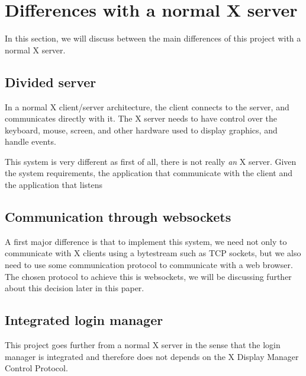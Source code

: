 \section{Differences with a normal X server}
In this section, we will discuss between the main differences of this project 
with a normal X server.
\subsection{Divided server}
In a normal X client/server architecture, the client connects to the server, 
and communicates directly with it. The X server needs to have control over the 
keyboard, mouse, screen, and other hardware used to display graphics, and handle events.

This system is very different as first of all, there is not really \emph{an} X server.
Given the system requirements, the application that communicate with the client and the 
application that listens 

\subsection{Communication through websockets}
A first major difference is that to implement this system, we need 
not only to communicate with X clients using a bytestream such as 
TCP sockets, but we also need to use some communication protocol to 
communicate with a web browser. The chosen protocol to achieve this is 
websockets, we will be discussing further about this decision later in 
this paper.
\subsection{Integrated login manager}
This project goes further from a normal X server in the sense that the 
login manager is integrated and therefore does not depends on the 
X Display Manager Control Protocol.

